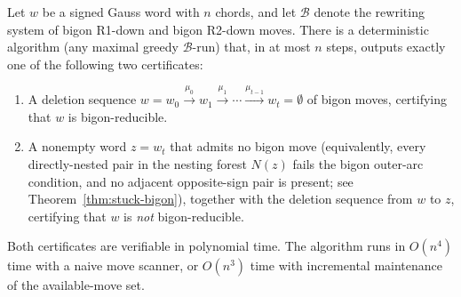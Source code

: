 
\begin{theorem}\label{thm:certifying-bigon-decision}
Let $w$ be a signed Gauss word with $n$ chords, and let $\mathcal{B}$
denote the rewriting system of bigon R1-down and bigon R2-down moves.
There is a deterministic algorithm (any maximal greedy $\mathcal{B}$-run)
that, in at most $n$ steps, outputs exactly one of the following two
certificates:
\begin{enumerate}
\item A deletion sequence
  $w = w_0 \xrightarrow{\mu_0} w_1 \xrightarrow{\mu_1} \cdots
  \xrightarrow{\mu_{t-1}} w_t = \emptyset$ of bigon moves,
  certifying that $w$ is bigon-reducible.
\item A nonempty word $z = w_t$ that admits no bigon move
  (equivalently, every directly-nested pair in the nesting forest
  $N(z)$ fails the bigon outer-arc condition, and no adjacent
  opposite-sign pair is present; see Theorem~\ref{thm:stuck-bigon}),
  together with the deletion sequence from $w$ to $z$, certifying
  that $w$ is \emph{not} bigon-reducible.
\end{enumerate}
Both certificates are verifiable in polynomial time. The algorithm
runs in $O(n^4)$ time with a naive move scanner, or $O(n^3)$ time
with incremental maintenance of the available-move set.
\end{theorem}

